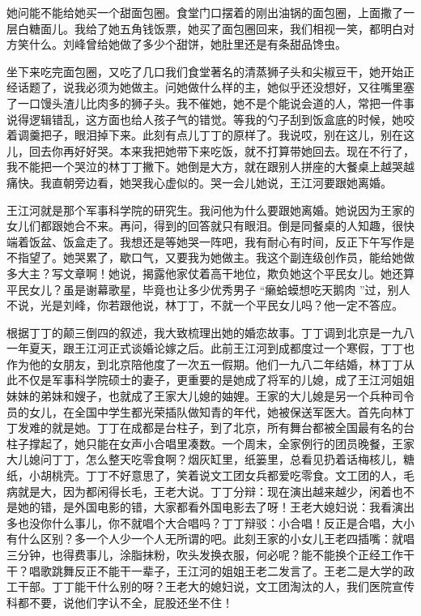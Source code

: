 \documentclass[12pt,twoside,openany]{book}
\begin{document}
她问能不能给她买一个甜面包圈。食堂门口摆着的刚出油锅的面包圈，上面撒了一层白糖面儿。我给了她五角钱饭票，她买了面包圈回来，我们相视一笑，都明白对方笑什么。刘峰曾给她做了多少个甜饼，她肚里还是有条甜品馋虫。

坐下来吃完面包圈，又吃了几口我们食堂著名的清蒸狮子头和尖椒豆干，她开始正经话题了，说我必须为她做主。问她做什么样的主，她似乎还没想好，又往嘴里塞了一口馒头渣儿比肉多的狮子头。我不催她，她不是个能说会道的人，常把一件事说得逻辑错乱，这方面也给人孩子气的错觉。等我的勺子刮到饭盒底的时候，她咬着调羹把子，眼泪掉下来。此刻有点儿丁丁的原样了。我说哎，别在这儿，别在这儿，回去你再好好哭。本来我把她带下来吃饭，就不打算带她回去。现在不行了，我不能把一个哭泣的林丁丁撇下。她倒是大方，就在跟别人拼座的大餐桌上越哭越痛快。我直朝旁边看，她哭我心虚似的。哭一会儿她说，王江河要跟她离婚。

王江河就是那个军事科学院的研究生。我问他为什么要跟她离婚。她说因为王家的女儿们都跟她合不来。再问，得到的回答就只有眼泪。倒是同餐桌的人知趣，很快端着饭盆、饭盒走了。我想还是等她哭一阵吧，我有耐心有时间，反正下午写作是不指望了。她哭累了，歇口气，又要我为她做主。我这个副连级创作员，能给她做多大主？写文章啊！她说，揭露他家仗着高干地位，欺负她这个平民女儿。她还算平民女儿？虽是谢幕歌星，毕竟也让多少优秀男子 “癞蛤蟆想吃天鹅肉 ”过，别人不说，光是刘峰，你若跟他说，林丁丁，不就一个平民女儿吗？他一定不答应。

根据丁丁的颠三倒四的叙述，我大致梳理出她的婚恋故事。丁丁调到北京是一九八一年夏天，跟王江河正式谈婚论嫁之后。此前王江河到成都度过一个寒假，丁丁也作为他的女朋友，到北京陪他度了一次五一假期。他们一九八二年结婚，林丁丁从此不仅是军事科学院硕士的妻子，更重要的是她成了将军的儿媳，成了王江河姐姐妹妹的弟妹和嫂子，也就成了王家大儿媳的妯娌。王家的大儿媳是另一个兵种司令员的女儿，在全国中学生都光荣插队做知青的年代，她被保送军医大。首先向林丁丁发难的就是她。丁丁在成都是台柱子，到了北京，所有舞台都被全国最有名的台柱子撑起了，她只能在女声小合唱里凑数。一个周末，全家例行的团员晚餐，王家大儿媳问丁丁，怎么整天吃零食啊？烟灰缸里，纸篓里，总看见扔着话梅核儿，糖纸，小胡桃壳。丁丁不好意思了，笑着说文工团女兵都爱吃零食。文工团的人，毛病就是大，因为都闲得长毛，王老大说。丁丁分辩：现在演出越来越少，闲着也不是她的错，是外国电影的错，大家都看外国电影去了呀！王老大媳妇说：我看演出多也没你什么事儿，你不就唱个大合唱吗？丁丁辩驳：小合唱！反正是合唱，大小有什么区别？多一个人少一个人无所谓的吧。此刻王家的小女儿王老四插嘴：就唱三分钟，也得费事儿，涂脂抹粉，吹头发换衣服，何必呢？能不能换个正经工作干干？唱歌跳舞反正不能干一辈子，王江河的姐姐王老二发言了。王老二是大学的政工干部。丁丁能干什么别的呀？王老大的媳妇说，文工团淘汰的人，我们医院宣传科都不要，说他们字认不全，屁股还坐不住！
\end{document}
